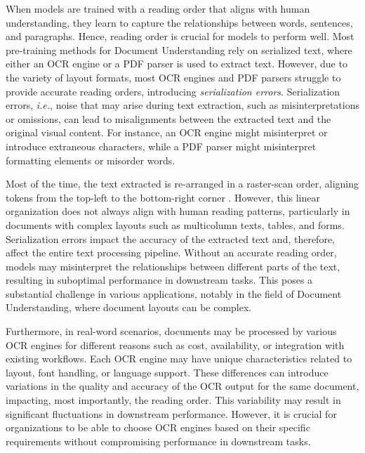 When models are trained with a reading order that aligns with human understanding, they learn to capture the relationships between words, sentences, and paragraphs. Hence, reading order is crucial for models to perform well. Most pre-training methods for Document Understanding rely on serialized text, where either an \ac{OCR} engine or a PDF parser is used to extract text. However, due to the variety of layout formats, most \ac{OCR} engines and PDF parsers struggle to provide accurate reading orders, introducing \textit{serialization errors}. Serialization errors, \textit{i.e.}, noise that may arise during text extraction, such as misinterpretations or omissions, can lead to misalignments between the extracted text and the original visual content. For instance, an \ac{OCR} engine might misinterpret or introduce extraneous characters, while a PDF parser might misinterpret formatting elements or misorder words. 

Most of the time, the text extracted is re-arranged in a raster-scan order, aligning tokens from the top-left to the bottom-right corner \citep{clausner2013significance}. However, this linear organization does not always align with human reading patterns, particularly in documents with complex layouts such as multicolumn texts, tables, and forms. Serialization errors impact the accuracy of the extracted text and, therefore, affect the entire text processing pipeline. Without an accurate reading order, models may misinterpret the relationships between different parts of the text, resulting in suboptimal performance in downstream tasks. This poses a substantial challenge in various applications, notably in the field of Document Understanding, where document layouts can be complex. 

Furthermore, in real-word scenarios, documents may be processed by various \ac{OCR} engines for different reasons such as cost, availability, or integration with existing workflows. Each \ac{OCR} engine may have unique characteristics related to layout, font handling, or language support. These differences can introduce variations in the quality and accuracy of the \ac{OCR} output for the same document, impacting, most importantly, the reading order. This variability may result in significant fluctuations in downstream performance. However, it is crucial for organizations to be able to choose \ac{OCR} engines based on their specific requirements without compromising performance in downstream tasks.


